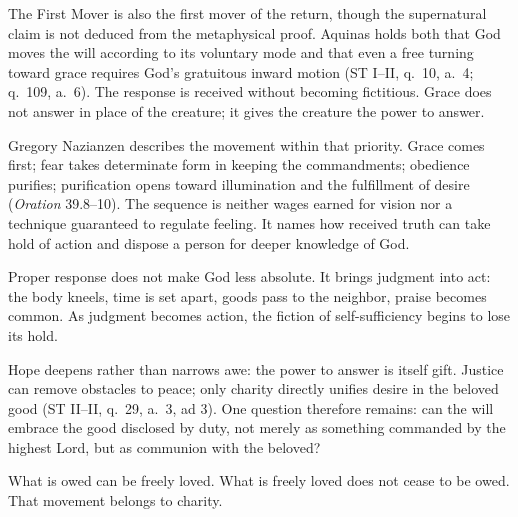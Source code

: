 The First Mover is also the first mover of the return, though the supernatural claim is not deduced from the metaphysical proof. Aquinas holds both that God moves the will according to its voluntary mode and that even a free turning toward grace requires God's gratuitous inward motion (ST I--II, q.~10, a.~4; q.~109, a.~6). The response is received without becoming fictitious. Grace does not answer in place of the creature; it gives the creature the power to answer.

Gregory Nazianzen describes the movement within that priority. Grace comes first; fear takes determinate form in keeping the commandments; obedience purifies; purification opens toward illumination and the fulfillment of desire (\emph{Oration} 39.8--10). The sequence is neither wages earned for vision nor a technique guaranteed to regulate feeling. It names how received truth can take hold of action and dispose a person for deeper knowledge of God.

Proper response does not make God less absolute. It brings judgment into act: the body kneels, time is set apart, goods pass to the neighbor, praise becomes common. As judgment becomes action, the fiction of self-sufficiency begins to lose its hold.

Hope deepens rather than narrows awe: the power to answer is itself gift. Justice can remove obstacles to peace; only charity directly unifies desire in the beloved good (ST II--II, q.~29, a.~3, ad 3). One question therefore remains: can the will embrace the good disclosed by duty, not merely as something commanded by the highest Lord, but as communion with the beloved?

What is owed can be freely loved. What is freely loved does not cease to be owed. That movement belongs to charity.
